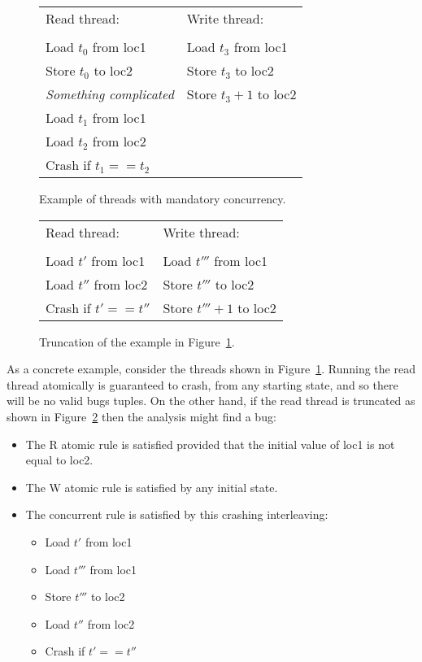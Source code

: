 \begin{figure}
\begin{tabular}{ll}
Read thread:         & Write thread: \\
\\
Load $t_0$ from loc1   & Load $t_3$ from loc1 \\
Store $t_0$ to loc2    & Store $t_3$ to loc2 \\
\textit{Something complicated} & Store $t_3 + 1$ to loc2 \\
Load $t_1$ from loc1  & \\
Load $t_2$ from loc2 & \\
Crash if $t_1 == t_2$ & \\
\end{tabular}
\caption{Example of threads with mandatory concurrency.}
\label{fig:mandatory_concurrency1}
\end{figure}

\begin{figure}
\begin{tabular}{ll}
Read thread:          & Write thread: \\
\\
Load $t'$ from loc1   & Load $t'''$ from loc1 \\
Load $t''$ from loc2  & Store $t'''$ to loc2 \\
Crash if $t' == t''$  & Store $t''' + 1$ to loc2
\end{tabular}
\caption{Truncation of the example in Figure~\ref{fig:mandatory_concurrency1}.}
\label{fig:mandatory_concurrency2}
\end{figure}

As a concrete example, consider the threads shown in
Figure~\ref{fig:mandatory_concurrency1}.  Running the read thread
atomically is guaranteed to crash, from any starting state, and so
there will be no valid bugs tuples.  On the other hand, if the read
thread is truncated as shown in
Figure~\ref{fig:mandatory_concurrency2} then the analysis might find a
bug:

\begin{itemize}
\item
  The R atomic rule is satisfied provided that the initial value of
  loc1 is not equal to loc2.
\item
  The W atomic rule is satisfied by any initial state.
\item
  The concurrent rule is satisfied by this crashing interleaving:
  \begin{itemize}
  \item Load $t'$ from loc1
  \item Load $t'''$ from loc1
  \item Store $t'''$ to loc2
  \item Load $t''$ from loc2
  \item Crash if $t' == t''$
  \end{itemize}
\end{itemize}

